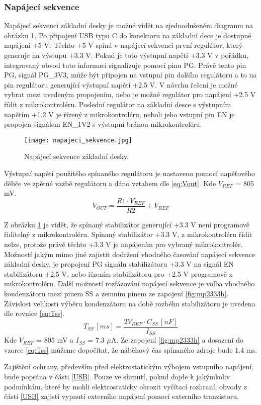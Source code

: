 	\subsubsection{Napájecí sekvence}
	Napájecí sekvenci základní desky je možné vidět na zjednodušeném diagramu na obrázku \ref{fig:napajeci_sekvecne}. Po připojení USB typu C do konektoru na základní dece je dostupné napájení +5 V. Těchto +5 V spíná v napájecí sekvenci první regulátor, který generuje na výstupu +3.3 V. Pokud je toto výstupní napětí +3.3 V v pořádku, integrovaný obvod tuto informaci signalizuje pomocí pinu PG. Právě tento pin PG, signál PG\_3V3, může být připojen na vstupní pin dalšího regulátoru a to na pin regulátoru generující výstupní napětí +2.5 V. V návrhu řešení je možné vybrat mezi uvedeným propojením, nebo je možné regulátor pro napájení +2.5 V řídit z mikrokontroléru. Poslední regulátor na základní desce s výstupním napětím +1.2 V je řízený z mikrokontroléru, neboli jeho vstupní pin EN je propojen signálem EN\_1V2 s výstupní bránou mikrokontroléru.
	\begin{figure}[h!]
		\centering
		\captionsetup{justification=centering}
		\texttt{[image: napajeci\_sekvence.jpg]}
		\caption{Napájecí sekvence základní desky.} 
		\label{fig:napajeci_sekvecne}
	\end{figure}
	\par Výstupní napětí použitého spínaného regulátoru je nastaveno pomocí napěťového děliče ve zpětné vazbě regulátoru a dáno vztahem dle \ref{eq:Vout}. Kde $V_{REF}$ = 805 mV.
	\begin{equation}
		V_{OUT} = \frac{R1 \cdot V_{REF}}{R2} + V_{REF}
		\label{eq:Vout}
	\end{equation}

	\par Z obrázku \ref{fig:napajeci_sekvecne} je vidět, že spínaný stabilizátor generující +3.3 V není programově řiditelný z mikrokontroléru. Spínaný stabilizátor +3.3 V, z mikrokontroléru řídit nelze, protože právě těchto +3.3 V je napájením pro vybraný mikrokontrolér. Možností jakým mimo jiné zajistit dodržení vhodného časování napájecí sekvence základní desky, je propojení PG signálu stabilizátoru +3.3 V na signál EN stabilizátoru +2.5 V, nebo řízením stabilizátoru pro +2.5 V programově z mikrokontroléru. Další možností rozfázování napájecí sekvence je volba vhodného kondenzátoru mezi pinem SS a zemním pinem ze zapojení \ref{fig:mp2333h}. Závislost velikosti výběru kondenzátoru na době rozběhu stabilizátoru je uvedena dle rovnice \ref{eq:Tss}.
	\begin{equation}
		T_{SS}\,[ms] = \frac{2V_{REF} \cdot C_{SS} \,[nF]}{I_{SS}}
		\label{eq:Tss}
	\end{equation}
	Kde $V_{REF}$ = 805 mV a $I_{SS}$ = 7.3 $\mu$A. Ze zapojení \ref{fig:mp2333h} a dosazení do vzorce \ref{eq:Tss} můžeme dopočítat, že náběhový čas spínaného zdroje bude 1.4 ms.
	\par Zajištění ochrany, především před elektrostatickým výbojem vstupního napájení, bude popsána v části \ref{USB}. Pouze ve shrnutí, pokud dojde k jakýmkoliv podmínkám, které by mohli elektrostaticky ohrozit vyčítací rozhraní, obvody z části \ref{USB} zajistí vypnutí externího napájení pomocí externího tranzistoru. 

